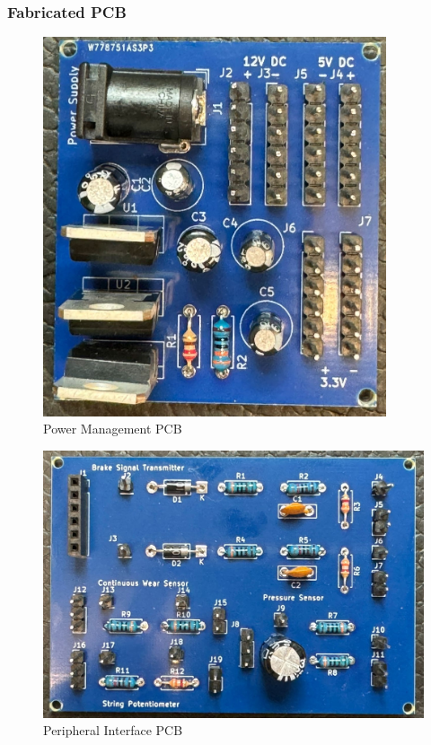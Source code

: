 \documentclass[8pt,compress,aspectratio=169]{beamer}
\begin{document}
\begin{frame}
  \frametitle{Fabricated PCB}
  \begin{minipage}{0.5\textwidth}
    \begin{figure}
      \includegraphics[width=0.9\textwidth]{assets/electronic/pcb1.jpeg}
      \caption{Power Management PCB}
    \end{figure}
  \end{minipage}
  \hfill
  \begin{minipage}{.475\textwidth}
  \begin{figure}
    \includegraphics[width=\textwidth]{assets/electronic/pcb2.jpeg}
      \caption{Peripheral Interface PCB}
  \end{figure}
  \end{minipage}
\end{frame}
\end{document}
